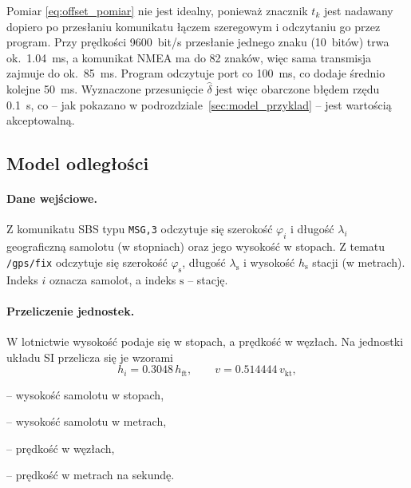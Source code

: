 Pomiar \eqref{eq:offset_pomiar} nie jest idealny, ponieważ znacznik $t_k$
jest nadawany dopiero po przesłaniu komunikatu łączem szeregowym i odczytaniu
go przez program. Przy prędkości \num{9600}~bit/s przesłanie jednego znaku
(10~bitów) trwa ok.\ \SI{1.04}{ms}, a komunikat NMEA ma do 82 znaków, więc
sama transmisja zajmuje do ok.\ \SI{85}{ms}. Program odczytuje port co
\SI{100}{ms}, co dodaje średnio kolejne \SI{50}{ms}. Wyznaczone przesunięcie
$\hat{\delta}$ jest więc obarczone błędem rzędu \SI{0.1}{s}, co -- jak
pokazano w podrozdziale~\ref{sec:model_przyklad} -- jest wartością
akceptowalną.

\subsection{Model odległości}
\label{sec:model_odleglosc}

\paragraph{Dane wejściowe.}
Z komunikatu SBS typu \texttt{MSG,3} odczytuje się szerokość $\varphi_i$
i długość $\lambda_i$ geograficzną samolotu (w stopniach) oraz jego wysokość
w stopach. Z tematu \texttt{/gps/fix} odczytuje się szerokość
$\varphi_{\mathrm{s}}$, długość $\lambda_{\mathrm{s}}$ i wysokość
$h_{\mathrm{s}}$ stacji (w metrach). Indeks $i$ oznacza samolot, a indeks
$\mathrm{s}$ -- stację.

\paragraph{Przeliczenie jednostek.}
W lotnictwie wysokość podaje się w stopach, a prędkość w węzłach. Na
jednostki układu SI przelicza się je wzorami
\begin{equation}
  h_i = \num{0.3048}\, h_{\mathrm{ft}}, \qquad
  v = \num{0.514444}\, v_{\mathrm{kt}},
  \label{eq:jednostki}
\end{equation}
\begin{objasnienia}
  \item[$h_{\mathrm{ft}}$] -- wysokość samolotu w stopach,
  \item[$h_i$] -- wysokość samolotu w metrach,
  \item[$v_{\mathrm{kt}}$] -- prędkość w węzłach,
  \item[$v$] -- prędkość w metrach na sekundę.
\end{objasnienia}

